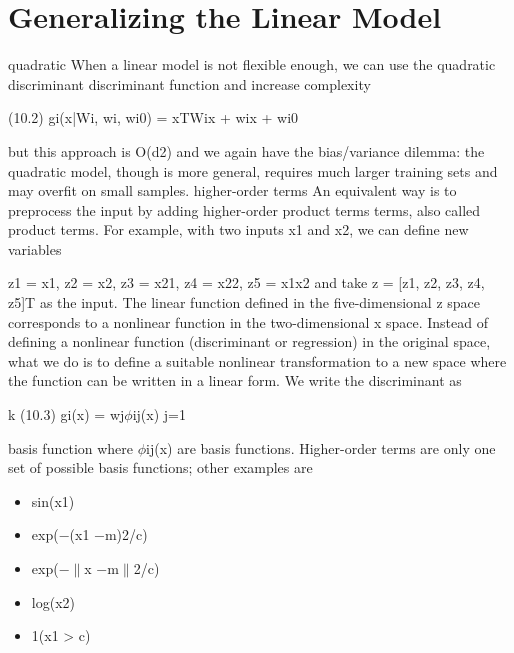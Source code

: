 \section{Generalizing the Linear Model}

quadratic When a linear model is not flexible enough, we can use the quadratic discriminant discriminant function and increase complexity

(10.2) gi(x|Wi, wi, wi0) = xTWix + wix + wi0

but this approach is O(d2) and we again have the bias/variance dilemma: the quadratic model, though is more general, requires much larger training sets and may overfit on small samples. higher-order terms An equivalent way is to preprocess the input by adding higher-order product terms terms, also called product terms. For example, with two inputs x1 and x2, we can define new variables

z1 = x1, z2 = x2, z3 = x21, z4 = x22, z5 = x1x2 and take z = [z1, z2, z3, z4, z5]T as the input. The linear function defined in the five-dimensional z space corresponds to a nonlinear function in the two-dimensional x space. Instead of defining a nonlinear function (discriminant or regression) in the original space, what we do is to define a suitable nonlinear transformation to a new space where the function can be written in a linear form. We write the discriminant as

k (10.3) gi(x) = wj$\phi$ij(x) j=1

basis function where $\phi$ij(x) are basis functions. Higher-order terms are only one set of possible basis functions; other examples are

\begin{itemize}
\item sin(x1)
\end{itemize}

\begin{itemize}
\item exp($-$(x1 $-$m)2/c)
\end{itemize}

\begin{itemize}
\item exp($-$$\parallel$x $-$m$\parallel$2/c)
\end{itemize}

\begin{itemize}
\item log(x2)
\end{itemize}

\begin{itemize}
\item 1(x1 > c)
\end{itemize}

